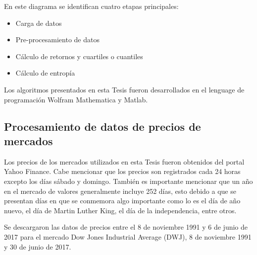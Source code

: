 En este diagrama se identifican cuatro etapas principales:

\begin{itemize}
	\item Carga de datos
	\item Pre-procesamiento de datos
	\item Cálculo de retornos y cuartiles o cuantiles
	\item Cálculo de entropía
\end{itemize}

Los algoritmos presentados en esta Tesis fueron desarrollados en el lenguage de programación Wolfram Mathematica y Matlab.


\subsection{Procesamiento de datos de precios de mercados}
\label{sec_data}
Los precios de los mercados utilizados en esta Tesis fueron obtenidos del portal Yahoo Finance. 
Cabe mencionar que los precios son registrados cada 24 horas excepto los días sábado y domingo. También es importante mencionar que un año en el mercado de valores generalmente incluye 252 días, esto debido a que se presentan días en que se conmemora algo importante como lo es el día de año nuevo, el día de Martin Luther King, el día de la independencia, entre otros. 

Se descargaron las datos de precios entre el 8 de noviembre 1991 y 6 de junio de 2017 para el mercado Dow Jones Industrial Average (DWJ), 8 de noviembre 1991 y 30 de junio de 2017.
%

